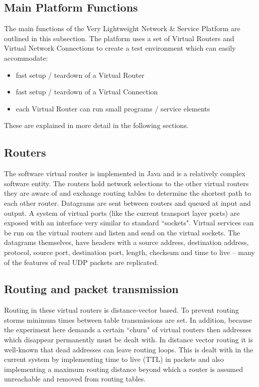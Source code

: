 \subsection{Main Platform Functions}

The main functions of the  Very Lightweight Network \& Service
Platform are outlined in this subsection. 
The platform uses a set of Virtual Routers and Virtual
Network Connections to create a test environment which can easily
accommodate:
\begin{itemize}
\item fast setup / teardown of a Virtual Router
\item fast setup / teardown of a Virtual Connection
\item each Virtual Router can run small programs / service elements
\end{itemize}

\noindent These are explained in more detail in the following sections.

\subsection{Routers}

The software virtual router is implemented in Java and is a relatively complex 
software entity.  The routers hold network selections to the other virtual
routers they are aware of and exchange routing tables to determine the 
shortest path to each other router.  Datagrams are sent between routers
and queued at input and output.  A system of virtual ports (like the 
current transport layer ports) are exposed with an interface very similar
to standard ``sockets".  Virtual services can be run on the virtual
routers and listen and send on the virtual sockets. 
The datagrams themselves, have headers 
with a source address, destination address, protocol, source port, destination port,
length, checksum and time to live -- many of the features of real UDP
packets are replicated.  

\subsection{Routing and packet transmission}

Routing in these virtual routers is distance-vector based.  To prevent routing storms
minimum times between table transmissions are set.  In addition, because
the experiment here demands a certain ``churn" of virtual routers
then addresses which disappear permanently must be dealt with.  In distance
vector routing it is well-known that dead addresses can leave routing loops.
This is dealt with in the current system by implementing time to live
(TTL) in packets and
also implementing a maximum routing distance beyond which a router is assumed
unreachable and removed from routing tables.

